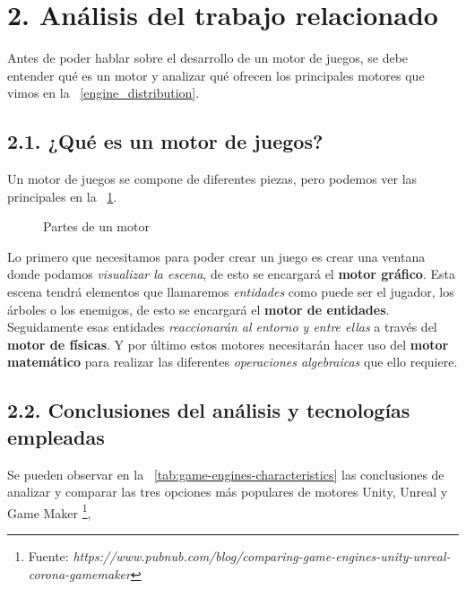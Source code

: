 \chapter*{2. Análisis del trabajo relacionado}\label{cap:analysis}

Antes de poder hablar sobre el desarrollo de un motor de juegos, se debe entender qué es un motor y analizar qué ofrecen los principales
motores que vimos en la \figurename~\ref{engine_distribution}. 

\section*{2.1. ¿Qué es un motor de juegos?}\label{sec:game-engine}

Un motor de juegos se compone de diferentes piezas, pero podemos ver las principales en la \figurename~\ref{engine_components}.

\begin{figure}[h!]
    \centering
    \caption{Partes de un motor}
    \label{engine_components}
\end{figure}

Lo primero que necesitamos para poder crear un juego es crear una ventana donde podamos \textit{visualizar la escena}, 
de esto se encargará el \textbf{motor gráfico}. Esta escena tendrá elementos que llamaremos \textit{entidades} como puede ser el jugador,
los árboles o los enemigos, de esto se encargará el \textbf{motor de entidades}. Seguidamente esas entidades \textit{reaccionarán al
entorno y entre ellas} a través del \textbf{motor de físicas}. Y por último estos motores necesitarán hacer uso del \textbf{motor matemático}
para realizar las diferentes \textit{operaciones algebraicas} que ello requiere.

\newpage

\section*{2.2. Conclusiones del análisis y tecnologías empleadas}\label{sec:technologies}

Se pueden observar en la \tablename~\ref{tab:game-engines-characteristics} las conclusiones de analizar y comparar las tres opciones más populares de motores Unity\cite{Unity}, Unreal\cite{Unreal} y Game Maker\cite{gamemaker} \footnote{Fuente: \textit{https://www.pubnub.com/blog/comparing-game-engines-unity-unreal-corona-gamemaker}}, 

